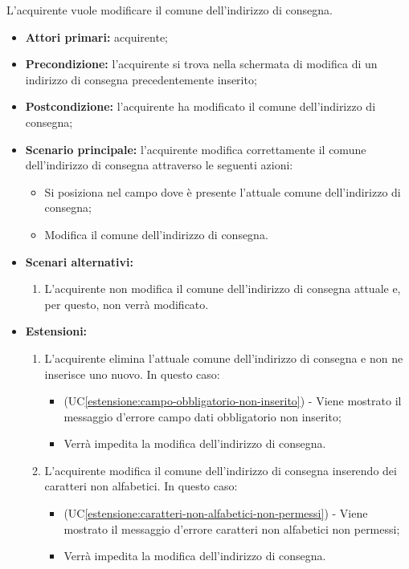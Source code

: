 L'acquirente vuole modificare il comune dell'indirizzo di consegna.
\begin{itemize}
    \item \textbf{Attori primari:} acquirente;
    \item \textbf{Precondizione:} l'acquirente si trova nella schermata di modifica di un indirizzo di consegna precedentemente inserito;
    \item \textbf{Postcondizione:} l'acquirente ha modificato il comune dell'indirizzo di consegna;
    \item \textbf{Scenario principale:} l'acquirente modifica correttamente il comune dell'indirizzo di consegna attraverso le seguenti azioni:
    \begin{itemize}
        \item Si posiziona nel campo dove è presente l'attuale comune dell'indirizzo di consegna;
        \item Modifica il comune dell'indirizzo di consegna.
    \end{itemize}
    \item \textbf{Scenari alternativi:}
    \begin{enumerate}[label=\lett]
        \item L'acquirente non modifica il comune dell'indirizzo di consegna attuale e, per questo, non verrà modificato.
    \end{enumerate}
    \item \textbf{Estensioni:}
    \begin{enumerate}[label=\lett]
        \item L'acquirente elimina l'attuale comune dell'indirizzo di consegna e non ne inserisce uno nuovo. In questo caso:
        \begin{itemize}
            \item (UC\ref{estensione:campo-obbligatorio-non-inserito}) - Viene mostrato il messaggio d'errore campo dati obbligatorio non inserito;
            \item Verrà impedita la modifica dell'indirizzo di consegna.
        \end{itemize}
        \item L'acquirente modifica il comune dell'indirizzo di consegna inserendo dei caratteri non alfabetici. In questo caso:
        \begin{itemize}
            \item (UC\ref{estensione:caratteri-non-alfabetici-non-permessi}) - Viene mostrato il messaggio d'errore caratteri non alfabetici non permessi;
            \item Verrà impedita la modifica dell'indirizzo di consegna.
        \end{itemize}
    \end{enumerate}
\end{itemize}

